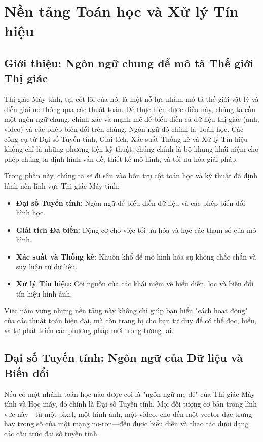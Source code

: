 \section{Nền tảng Toán học và Xử lý Tín hiệu}
\label{sec:math_and_signal_processing}

\subsection{Giới thiệu: Ngôn ngữ chung để mô tả Thế giới Thị giác}

Thị giác Máy tính, tại cốt lõi của nó, là một nỗ lực nhằm mô tả thế giới vật lý và diễn giải nó thông qua các thuật toán. Để thực hiện được điều này, chúng ta cần một ngôn ngữ chung, chính xác và mạnh mẽ để biểu diễn cả dữ liệu thị giác (ảnh, video) và các phép biến đổi trên chúng. Ngôn ngữ đó chính là Toán học. Các công cụ từ Đại số Tuyến tính, Giải tích, Xác suất Thống kê và Xử lý Tín hiệu không chỉ là những phương tiện kỹ thuật; chúng chính là bộ khung khái niệm cho phép chúng ta định hình vấn đề, thiết kế mô hình, và tối ưu hóa giải pháp.

Trong phần này, chúng ta sẽ đi sâu vào bốn trụ cột toán học và kỹ thuật đã định hình nên lĩnh vực Thị giác Máy tính:
\begin{itemize}
    \item \textbf{Đại số Tuyến tính:} Ngôn ngữ để biểu diễn dữ liệu và các phép biến đổi hình học.
    \item \textbf{Giải tích Đa biến:} Động cơ cho việc tối ưu hóa và học các tham số của mô hình.
    \item \textbf{Xác suất và Thống kê:} Khuôn khổ để mô hình hóa sự không chắc chắn và suy luận từ dữ liệu.
    \item \textbf{Xử lý Tín hiệu:} Cội nguồn của các khái niệm về biểu diễn, lọc và biến đổi tín hiệu hình ảnh.
\end{itemize}
Việc nắm vững những nền tảng này không chỉ giúp bạn hiểu "cách hoạt động" của các thuật toán hiện đại, mà còn trang bị cho bạn tư duy để có thể đọc, hiểu, và tự phát triển các phương pháp mới trong tương lai.

\subsection{Đại số Tuyến tính: Ngôn ngữ của Dữ liệu và Biến đổi}

Nếu có một nhánh toán học nào được coi là "ngôn ngữ mẹ đẻ" của Thị giác Máy tính và Học máy, đó chính là Đại số Tuyến tính. Mọi đối tượng cơ bản trong lĩnh vực này—từ một pixel, một hình ảnh, một video, cho đến một vector đặc trưng hay trọng số của một mạng nơ-ron—đều được biểu diễn và thao tác dưới dạng các cấu trúc đại số tuyến tính.

